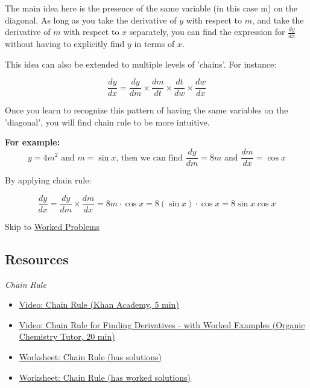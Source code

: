 \documentclass{article}
\begin{document}
\noindent The main idea here is the presence of the same variable (in this case m) on the diagonal. As long as you take the derivative of $y$ with respect to $m$, and take the derivative of $m$ with respect to $x$ separately, you can find the expression for $\frac{dy}{dx}$ without having to explicitly find $y$ in terms of $x$. 

\noindent 
\newline
This idea can also be extended to multiple levels of 'chains'. For instance:

$$\frac{dy}{dx} = \frac{dy}{dm} \times \frac{dm}{dt}\times\frac{dt}{dw}\times\frac{dw}{dx}$$

\noindent Once you learn to recognize this pattern of having the same variables on the 'diagonal', you will find chain rule to be more intuitive. 

\noindent 
\newline\textbf{For example:}
$$y = 4m^2 \text{ and } m = \sin{x} \text{, then we can find } \frac{dy}{dm} = 8m \text{ and } \frac{dm}{dx} = \cos x$$

By applying chain rule:

$$\frac{dy}{dx} = \frac{dy}{dm} \times \frac{dm}{dx} = 8m \cdot \cos x = 8(\sin x) \cdot \cos x = 8\sin x \cos x$$

Skip to \hyperref[WorkedProblems]{Worked Problems}
\subsection*{Resources}
\textit{Chain Rule}
\begin{itemize}
    \item \href{https://www.khanacademy.org/math/ap-calculus-ab/ab-differentiation-2-new/ab-3-1a/v/chain-rule-introduction}{Video: Chain Rule (Khan Academy, 5 min)}
    \item \href{https://youtu.be/HaHsqDjWMLU}{Video: Chain Rule for Finding Derivatives - with Worked Examples (Organic Chemistry Tutor, 20 min)}
    \item \href{https://www.rcboe.org/cms/lib/GA01903614/Centricity/Domain/9329/Practice-%20Chain%20Rule.pdf}{Worksheet: Chain Rule (has solutions)}
    \item \href{https://s3.amazonaws.com/calculus-worksheets/calculus-1-tutor/Calculus+1+Tutor+-+Worksheet+5+-+The+Chain+Rule.pdf}{Worksheet: Chain Rule (has worked solutions)}
\end{itemize}
\end{document}
